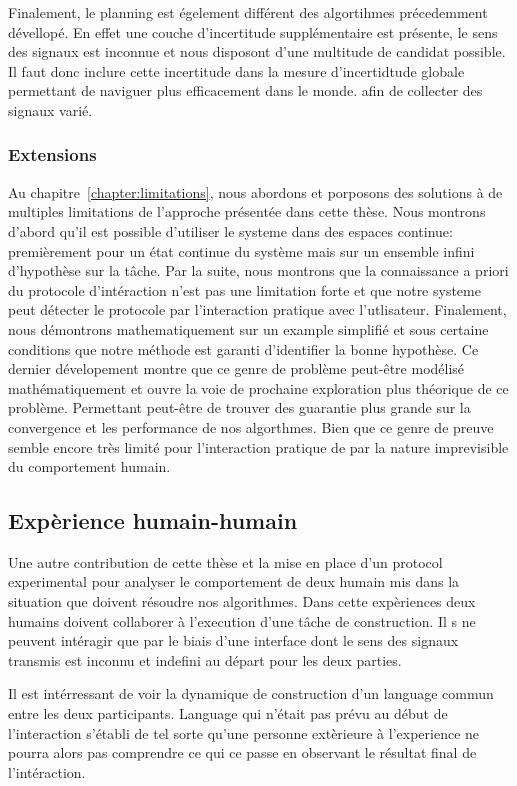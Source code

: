Finalement, le planning est égelement différent des algortihmes précedemment dévellopé. En effet une couche d'incertitude supplémentaire est présente, le sens des signaux est inconnue et nous disposont d'une multitude de candidat possible. Il faut donc inclure cette incertitude dans la mesure d'incertidtude globale permettant de naviguer plus efficacement dans le monde. afin de collecter des signaux varié.

\subsubsection*{Extensions}

Au chapitre~\ref{chapter:limitations}, nous abordons et porposons des solutions à de multiples limitations de l'approche présentée dans cette thèse. Nous montrons d'abord qu'il est possible d'utiliser le systeme dans des espaces continue: premièrement pour un état continue du système mais sur un ensemble infini d'hypothèse sur la tâche. Par la suite, nous montrons que la connaissance a priori du protocole d'intéraction n'est pas une limitation forte et que notre systeme peut détecter le protocole par l'interaction pratique avec l'utlisateur. Finalement, nous démontrons mathematiquement sur un example simplifié et sous certaine conditions que notre méthode est garanti d'identifier la bonne hypothèse. Ce dernier dévelopement montre que ce genre de problème peut-être modélisé mathématiquement et ouvre la voie de prochaine exploration plus théorique de ce problème. Permettant peut-être de trouver des  guarantie plus grande sur la convergence et les performance de nos algorthmes. Bien que ce genre de preuve semble encore très limité pour l'interaction pratique de par la nature imprevisible du comportement humain.

\subsection*{Expèrience humain-humain}

Une autre contribution de cette thèse et la mise en place d'un protocol experimental pour analyser le comportement de deux humain mis dans la situation que doivent résoudre nos algorithmes. Dans cette expèriences deux humains doivent collaborer à l'execution d'une tâche de construction. Il s ne peuvent intéragir que par le biais d'une interface dont le sens des signaux transmis est inconnu et indefini au départ pour les deux parties.

Il est intérressant de voir la dynamique de construction d'un language commun entre les deux participants. Language qui n'était pas prévu au début de l'interaction s'établi de tel sorte qu'une personne extèrieure à l'experience ne pourra alors pas comprendre ce qui ce passe en observant le résultat final de l'intéraction.

